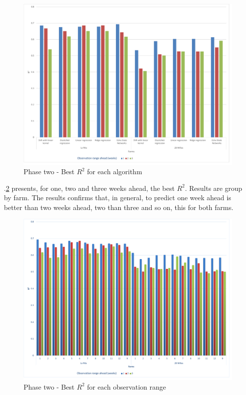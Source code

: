 \documentclass[review,authoryear,english]{elsarticle}
\begin{document}
\begin{figure}[H] 
 \centering
 \includegraphics[scale=.5]{Phase_two_Best_R2_for_each_algortihm}
 \caption{Phase two - Best $R^2$ for each algorithm} 
 \label{figura8} 
\end{figure}

\figurename $.$\ref{figura9} presents, for one, two and three weeks ahead, the best $R^2$. Results are group by farm. The results confirms that, in general, to predict one week ahead is better than two weeks ahead, two than three and so on, this for both farms.

\begin{figure}[H] 
 \centering
 \includegraphics[scale=.5]{Phase_two_Best_R2_for_each_number_of_observation_range_in_the_patterm}
 \caption{Phase two - Best $R^2$ for each observation range} 
 \label{figura9} 
\end{figure}
\end{document}
